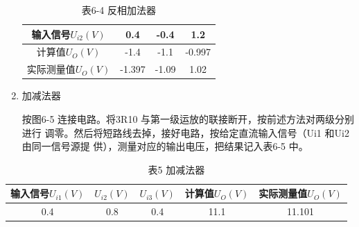 \documentclass[a4paper,10pt,notitlepage]{article}
\begin{document}
\begin{enumerate}
\begin{table}[h]
\begin{tabular}{|c|c|c|c|}
				\hline
				输入信号$U_{i2}(V)$ & 0.4 & -0.4 & 1.2 \\
				\hline
				计算值$U_O(V)$ & -1.4 & -1.1 & -0.997 \\
				\hline
				实际测量值$U_O(V)$ & -1.397 & -1.09 & 1.02 \\
				\hline
			\end{tabular}
			\caption*{表6-4 反相加法器}
		\end{table}
		\item 加减法器\par 
		\qquad 按图6-5 连接电路。将3R10 与第一级运放的联接断开，按前述方法对两级分别进行
		调零。然后将短路线去掉，接好电路，按给定直流输入信号（Ui1 和Ui2 由同一信号源提
		供），测量对应的输出电压，把结果记入表6-5 中。
	\end{enumerate}
	\begin{table}[ht]
		\centering
		\begin{tabular}{|c|c|c|c|c|}
			\hline
			输入信号$U_{i1}(V)$ & $U_{i2}(V)$ & $U_{i3}(V)$ & 计算值$U_O(V)$ & 实际测量值$U_O(V)$ \\
			\hline
			0.4 & 0.8 & 0.4 & 11.1 & 11.101 \\
			\hline
		\end{tabular}
		\caption*{表5 加减法器}
	\end{table}
	\newpage
\end{document}
